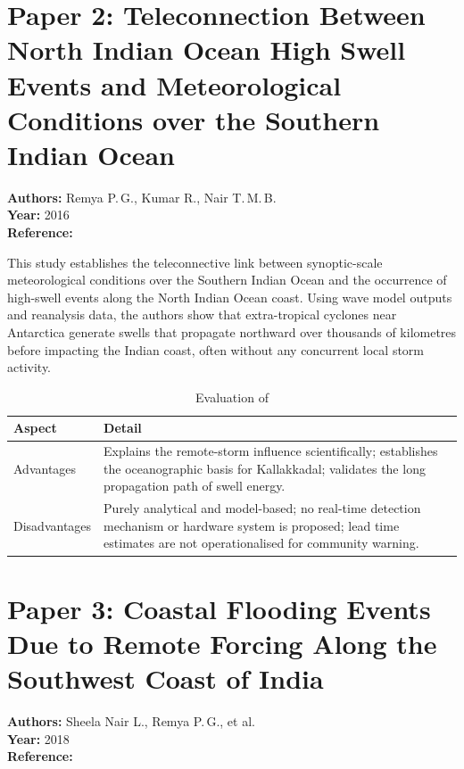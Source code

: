 \section{Paper 2: Teleconnection Between North Indian Ocean High Swell Events and
         Meteorological Conditions over the Southern Indian Ocean}

\textbf{Authors:} Remya P.\,G., Kumar R., Nair T.\,M.\,B.\\
\textbf{Year:} 2016\\
\textbf{Reference:} \cite{remya2016teleconnection}

This study establishes the teleconnective link between synoptic-scale meteorological
conditions over the Southern Indian Ocean and the occurrence of high-swell events
along the North Indian Ocean coast.
Using wave model outputs and reanalysis data, the authors show that extra-tropical
cyclones near Antarctica generate swells that propagate northward over thousands of
kilometres before impacting the Indian coast, often without any concurrent local storm
activity.

\begin{table}[H]
\centering
\caption{Evaluation of \cite{remya2016teleconnection}}
\label{tab:paper2}
\begin{tabularx}{\textwidth}{lX}
\toprule
\textbf{Aspect} & \textbf{Detail} \\
\midrule
Advantages &
  Explains the remote-storm influence scientifically;
  establishes the oceanographic basis for Kallakkadal;
  validates the long propagation path of swell energy. \\
\addlinespace
Disadvantages &
  Purely analytical and model-based;
  no real-time detection mechanism or hardware system is proposed;
  lead time estimates are not operationalised for community warning. \\
\bottomrule
\end{tabularx}
\end{table}

\section{Paper 3: Coastal Flooding Events Due to Remote Forcing Along the Southwest
         Coast of India}

\textbf{Authors:} Sheela Nair L., Remya P.\,G., et al.\\
\textbf{Year:} 2018\\
\textbf{Reference:} \cite{nair2018coastal}

